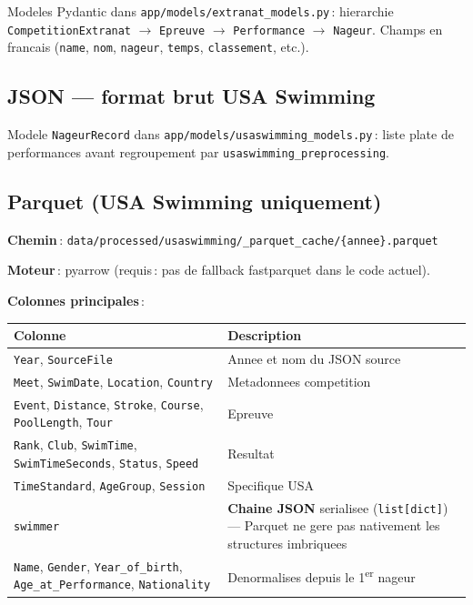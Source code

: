 \documentclass[11pt,a4paper]{article}
\begin{document}
Modeles Pydantic dans \texttt{app/models/extranat\_models.py}\,: hierarchie \texttt{CompetitionExtranat} $\rightarrow$ \texttt{Epreuve} $\rightarrow$ \texttt{Performance} $\rightarrow$ \texttt{Nageur}. Champs en francais (\texttt{name}, \texttt{nom}, \texttt{nageur}, \texttt{temps}, \texttt{classement}, etc.).

\subsection{JSON --- format brut USA Swimming}

Modele \texttt{NageurRecord} dans \texttt{app/models/usaswimming\_models.py}\,: liste plate de performances avant regroupement par \texttt{usaswimming\_preprocessing}.

\subsection{Parquet (USA Swimming uniquement)}
\label{sec:parquet}

\textbf{Chemin}\,: \texttt{data/processed/usaswimming/\_parquet\_cache/\{annee\}.parquet}

\textbf{Moteur}\,: pyarrow (requis\,: pas de fallback fastparquet dans le code actuel).

\textbf{Colonnes principales}\,:

\begin{longtable}{@{}p{}p{}@{}}
\toprule
\textbf{Colonne} & \textbf{Description} \\
\midrule
\endhead
\texttt{Year}, \texttt{SourceFile} & Annee et nom du JSON source \\
\texttt{Meet}, \texttt{SwimDate}, \texttt{Location}, \texttt{Country} & Metadonnees competition \\
\texttt{Event}, \texttt{Distance}, \texttt{Stroke}, \texttt{Course}, \texttt{PoolLength}, \texttt{Tour} & Epreuve \\
\texttt{Rank}, \texttt{Club}, \texttt{SwimTime}, \texttt{SwimTimeSeconds}, \texttt{Status}, \texttt{Speed} & Resultat \\
\texttt{TimeStandard}, \texttt{AgeGroup}, \texttt{Session} & Specifique USA \\
\texttt{swimmer} & \textbf{Chaine JSON} serialisee (\texttt{list[dict]}) --- Parquet ne gere pas nativement les structures imbriquees \\
\texttt{Name}, \texttt{Gender}, \texttt{Year\_of\_birth}, \texttt{Age\_at\_Performance}, \texttt{Nationality} & Denormalises depuis le 1\textsuperscript{er} nageur \\
\bottomrule
\end{longtable}
\end{document}
